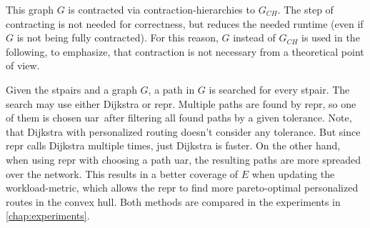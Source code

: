         This graph $G$ is contracted via contraction-hierarchies to $G_{CH}$.
        The step of contracting is not needed for correctness, but reduces the needed runtime (even if $G$ is not being fully contracted).
        For this reason, $G$ instead of $G_{CH}$ is used in the following, to emphasize, that contraction is not necessary from a theoretical point of view.

        Given the \glspl{stpair} and a graph $G$, a path in $G$ is searched for every \gls{stpair}.
        The search may use either Dijkstra or \gls{repr}.
        Multiple paths are found by \gls{repr}, so one of them is chosen \gls{uar}\ after filtering all found paths by a given tolerance.
        Note, that Dijkstra with personalized routing doesn't consider any tolerance.
        But since \gls{repr} calls Dijkstra multiple times, just Dijkstra is faster.
        On the other hand, when using \gls{repr} with choosing a path \gls{uar}, the resulting paths are more spreaded over the network.
        This results in a better coverage of $E$ when updating the workload-metric, which allows the \gls{repr} to find more pareto-optimal personalized routes in the convex hull.
        Both methods are compared in the experiments in \vref{chap:experiments}.


